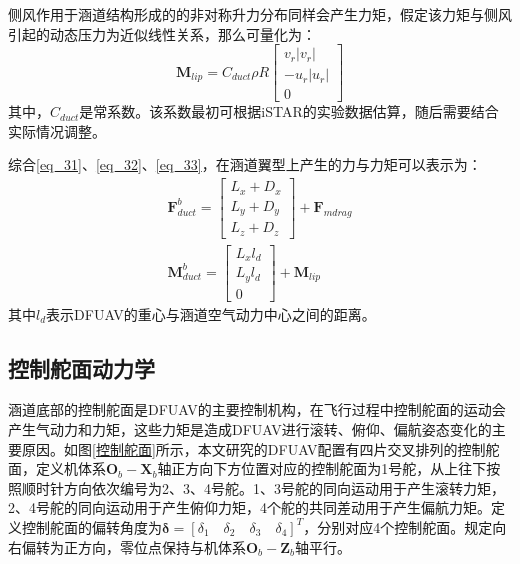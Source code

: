 侧风作用于涵道结构形成的的非对称升力分布同样会产生力矩，假定该力矩与侧风引起的动态压力为近似线性关系，那么可量化为：
\begin{equation}
    \boldsymbol{M}_{lip}=C_{duct}\rho{R}
    \begin{bmatrix}v_r|v_r| \\-u_r|u_r| \\0\end{bmatrix}
    \label{eq_33}
\end{equation}
其中，$C_{duct}$是常系数。该系数最初可根据iSTAR\cite{flemingImprovingControlSystem}的实验数据估算，随后需要结合实际情况调整。

综合\eqref{eq_31}、\eqref{eq_32}、\eqref{eq_33}，在涵道翼型上产生的力与力矩可以表示为\cite{johnsonModelingControlFlight2006b,choiStaticAnalysisSmall2012}：
\begin{align}
    \boldsymbol{F}_{duct}^b=
    \begin{bmatrix}
    L_x+D_x \\
    L_y+D_y \\
    L_z+D_z
    \end{bmatrix}+\boldsymbol{F} _{mdrag}\label{eq_33.5}\\
    \boldsymbol{M}_{duct}^b=
    \begin{bmatrix}
    L_xl_d \\
    L_yl_d \\
    0
    \end{bmatrix}+\boldsymbol{M}_{lip}
    \label{eq_34}
\end{align}
其中$l_d$表示DFUAV的重心与涵道空气动力中心之间的距离。

\subsection{控制舵面动力学}

涵道底部的控制舵面是DFUAV的主要控制机构，在飞行过程中控制舵面的运动会产生气动力和力矩，这些力矩是造成DFUAV进行滚转、俯仰、偏航姿态变化的主要原因。如图\ref{控制舵面}所示，本文研究的DFUAV配置有四片交叉排列的控制舵面，定义机体系${\boldsymbol{O}_b}-{\boldsymbol{X}_b}$轴正方向下方位置对应的控制舵面为1号舵，从上往下按照顺时针方向依次编号为2、3、4号舵。1、3号舵的同向运动用于产生滚转力矩，2、4号舵的同向运动用于产生俯仰力矩，4个舵的共同差动用于产生偏航力矩。定义控制舵面的偏转角度为$\boldsymbol{\delta}=[\delta_1\quad\delta_2\quad\delta_3\quad\delta_4]^T$，分别对应4个控制舵面。规定向右偏转为正方向，零位点保持与机体系${\boldsymbol{O}_b}-{\boldsymbol{Z}_b}$轴平行。

